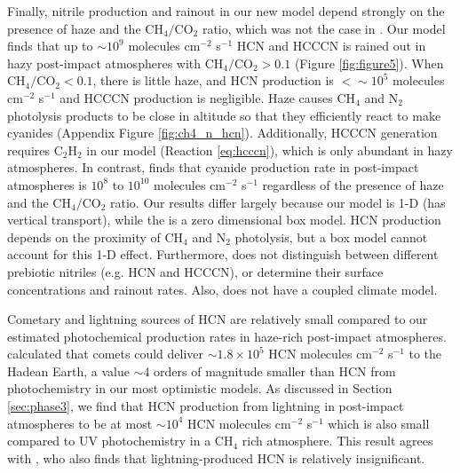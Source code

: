 Finally, nitrile production and rainout in our new model depend strongly on the presence of haze and the $\mathrm{CH_4}/\mathrm{CO_2}$ ratio, which was not the case in \citet{Zahnle_2020}. Our model finds that up to $\sim 10^9$ molecules cm$^{-2}$ s$^{-1}$ HCN and HCCCN is rained out in hazy post-impact atmospheres with $\mathrm{CH_4}/\mathrm{CO_2} > 0.1$ (Figure \ref{fig:figure5}). When $\mathrm{CH_4}/\mathrm{CO_2} < 0.1$, there is little haze, and HCN production is $< \sim 10^5$ molecules cm$^{-2}$ s$^{-1}$ and HCCCN production is negligible. Haze causes CH$_4$ and N$_2$ photolysis products to be close in altitude so that they efficiently react to make cyanides (Appendix Figure \ref{fig:ch4_n_hcn}). Additionally, HCCCN generation requires C$_2$H$_2$ in our model (Reaction \ref{eq:hcccn}), which is only abundant in hazy atmospheres. In contrast, \citet{Zahnle_2020} finds that cyanide production rate in post-impact atmospheres is $10^8$ to $10^{10}$ molecules cm$^{-2}$ s$^{-1}$ regardless of the presence of haze and the $\mathrm{CH_4}/\mathrm{CO_2}$ ratio. Our results differ largely because our model is 1-D (has vertical transport), while the \citet{Zahnle_2020} is a zero dimensional box model. HCN production depends on the proximity of CH$_4$ and N$_2$ photolysis, but a box model cannot account for this 1-D effect. Furthermore, \citet{Zahnle_2020} does not distinguish between different prebiotic nitriles (e.g. HCN and HCCCN), or determine their surface concentrations and rainout rates. Also, \citet{Zahnle_2020} does not have a coupled climate model.

Cometary and lightning sources of HCN are relatively small compared to our estimated photochemical production rates in haze-rich post-impact atmospheres. \citet{Todd_2020} calculated that comets could deliver $\sim 1.8 \times 10^{5}$ HCN molecules cm$^{-2}$ s$^{-1}$ to the Hadean Earth, a value $\sim 4$ orders of magnitude smaller than HCN from photochemistry in our most optimistic models. As discussed in Section \ref{sec:phase3}, we find that HCN production from lightning in post-impact atmospheres to be at most $\sim 10^{4}$ HCN molecules cm$^{-2}$ s$^{-1}$ which is also small compared to UV photochemistry in a CH$_4$ rich atmosphere. This result agrees with \citet{Pearce_2022}, who also finds that lightning-produced HCN is relatively insignificant.

